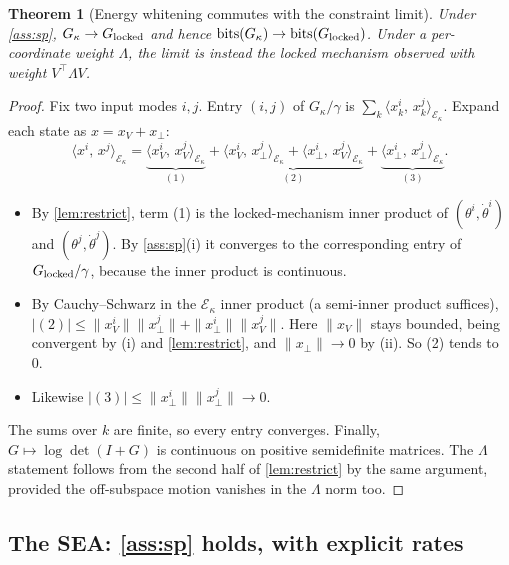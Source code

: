 \documentclass[11pt]{article}
\newtheorem{theorem}{Theorem}
\theoremstyle{definition}
\theoremstyle{remark}
\newcommand{\bits}{\operatorname{bits}}
\newcommand{\Em}{\mathcal{E}}         %
\newcommand{\ip}[2]{\langle #1,\,#2\rangle}
\begin{document}
\begin{theorem}[Energy whitening commutes with the constraint limit]\label{thm:limit}
Under \cref{ass:sp}, $G_\kappa\to G_{\rm locked}$ and hence
$\bits(G_\kappa)\to\bits(G_{\rm locked})$. Under a per-coordinate weight $\Lambda$, the
limit is instead the locked mechanism observed with weight $V^\top\Lambda V$.
\end{theorem}
\begin{proof}
Fix two input modes $i,j$. Entry $(i,j)$ of $G_\kappa/\gamma$ is
$\sum_k\ip{x_k^i}{x_k^j}_{\Em_\kappa}$. Expand each state as $x=x_V+x_\perp$:
\[
  \ip{x^i}{x^j}_{\Em_\kappa}
  =\underbrace{\ip{x_V^i}{x_V^j}_{\Em_\kappa}}_{(1)}
  +\underbrace{\ip{x_V^i}{x_\perp^j}_{\Em_\kappa}+\ip{x_\perp^i}{x_V^j}_{\Em_\kappa}}_{(2)}
  +\underbrace{\ip{x_\perp^i}{x_\perp^j}_{\Em_\kappa}}_{(3)} .
\]
\begin{itemize}[nosep]
  \item By \cref{lem:restrict}, term (1) is the locked-mechanism inner product of
        $(\theta^i,\dot\theta^i)$ and $(\theta^j,\dot\theta^j)$. By \cref{ass:sp}(i) it
        converges to the corresponding entry of $G_{\rm locked}/\gamma$, because the
        inner product is continuous.
  \item By Cauchy--Schwarz in the $\Em_\kappa$ inner product (a semi-inner product
        suffices),
        $|(2)|\le\|x_V^i\|\|x_\perp^j\|+\|x_\perp^i\|\|x_V^j\|$. Here $\|x_V\|$ stays
        bounded, being convergent by (i) and \cref{lem:restrict}, and $\|x_\perp\|\to0$
        by (ii). So (2) tends to 0.
  \item Likewise $|(3)|\le\|x_\perp^i\|\|x_\perp^j\|\to0$.
\end{itemize}
The sums over $k$ are finite, so every entry converges. Finally, $G\mapsto\log\det(I+G)$
is continuous on positive semidefinite matrices. The $\Lambda$ statement follows from the
second half of \cref{lem:restrict} by the same argument, provided the off-subspace motion
vanishes in the $\Lambda$ norm too.
\end{proof}

\subsection{The SEA: \cref{ass:sp} holds, with explicit rates}
\end{document}
